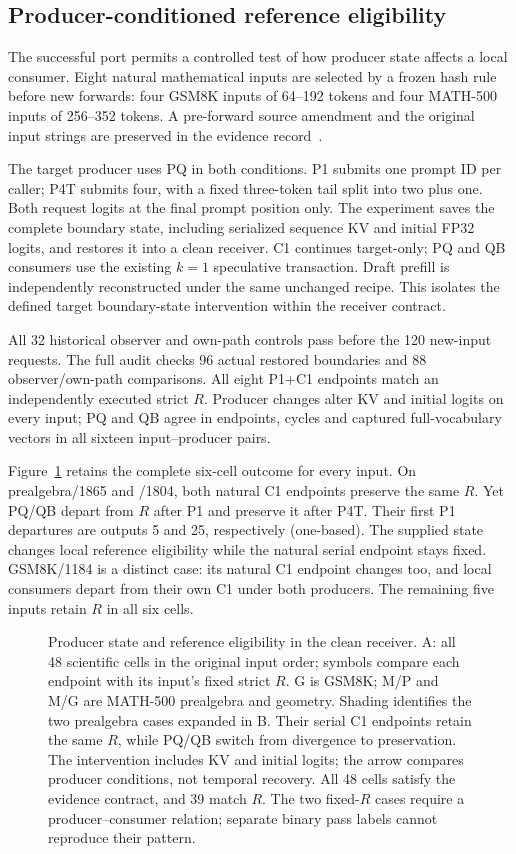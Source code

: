 \subsection{Producer-conditioned reference eligibility}
\label{sec:producerfinal}
The successful port permits a controlled test of how producer state affects a local consumer. Eight natural mathematical inputs are selected by a frozen hash rule before new forwards: four GSM8K inputs of 64--192 tokens and four MATH-500 inputs of 256--352 tokens. A pre-forward source amendment and the original input strings are preserved in the evidence record~\cite{b570producer}.

The target producer uses PQ in both conditions. P1 submits one prompt ID per caller; P4T submits four, with a fixed three-token tail split into two plus one. Both request logits at the final prompt position only. The experiment saves the complete boundary state, including serialized sequence KV and initial FP32 logits, and restores it into a clean receiver. C1 continues target-only; PQ and QB consumers use the existing $k=1$ speculative transaction. Draft prefill is independently reconstructed under the same unchanged recipe. This isolates the defined target boundary-state intervention within the receiver contract.

All 32 historical observer and own-path controls pass before the 120 new-input requests. The full audit checks 96 actual restored boundaries and 88 observer/own-path comparisons. All eight P1+C1 endpoints match an independently executed strict $R$. Producer changes alter KV and initial logits on every input; PQ and QB agree in endpoints, cycles and captured full-vocabulary vectors in all sixteen input--producer pairs.

Figure~\ref{fig:producerfinal} retains the complete six-cell outcome for every input. On prealgebra/1865 and /1804, both natural C1 endpoints preserve the same $R$. Yet PQ/QB depart from $R$ after P1 and preserve it after P4T. Their first P1 departures are outputs 5 and 25, respectively (one-based). The supplied state changes local reference eligibility while the natural serial endpoint stays fixed. GSM8K/1184 is a distinct case: its natural C1 endpoint changes too, and local consumers depart from their own C1 under both producers. The remaining five inputs retain $R$ in all six cells.

\begin{figure}[t]\centering
\resizebox{\textwidth}{!}{}
\caption{Producer state and reference eligibility in the clean receiver. A: all 48 scientific cells in the original input order; symbols compare each endpoint with its input's fixed strict $R$. G is GSM8K; M/P and M/G are MATH-500 prealgebra and geometry. Shading identifies the two prealgebra cases expanded in B. Their serial C1 endpoints retain the same $R$, while PQ/QB switch from divergence to preservation. The intervention includes KV and initial logits; the arrow compares producer conditions, not temporal recovery. All 48 cells satisfy the evidence contract, and 39 match $R$. The two fixed-$R$ cases require a producer--consumer relation; separate binary pass labels cannot reproduce their pattern.}\label{fig:producerfinal}
\end{figure}

